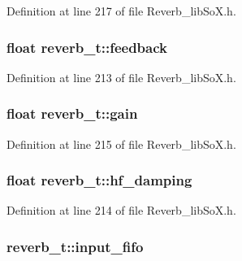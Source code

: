 Definition at line 217 of file Reverb\+\_\+lib\+So\+X.\+h.

\subsubsection[{\texorpdfstring{feedback}{feedback}}]{\setlength{\rightskip}{0pt plus 5cm}float reverb\+\_\+t\+::feedback}\hypertarget{structreverb__t_a8e09720386c31e99f2f011b3cee5c6c0}{}\label{structreverb__t_a8e09720386c31e99f2f011b3cee5c6c0}


Definition at line 213 of file Reverb\+\_\+lib\+So\+X.\+h.

\subsubsection[{\texorpdfstring{gain}{gain}}]{\setlength{\rightskip}{0pt plus 5cm}float reverb\+\_\+t\+::gain}\hypertarget{structreverb__t_ab361b62127cc123d7c218d0b2667d9e9}{}\label{structreverb__t_ab361b62127cc123d7c218d0b2667d9e9}


Definition at line 215 of file Reverb\+\_\+lib\+So\+X.\+h.

\subsubsection[{\texorpdfstring{hf\+\_\+damping}{hf_damping}}]{\setlength{\rightskip}{0pt plus 5cm}float reverb\+\_\+t\+::hf\+\_\+damping}\hypertarget{structreverb__t_a90fe27c0300bfecd2bc770d908c0797d}{}\label{structreverb__t_a90fe27c0300bfecd2bc770d908c0797d}


Definition at line 214 of file Reverb\+\_\+lib\+So\+X.\+h.

\subsubsection[{\texorpdfstring{input\+\_\+fifo}{input_fifo}}]{ reverb\+\_\+t\+::input\+\_\+fifo}\hypertarget{structreverb__t_a600770163691a92853976fe0f5e70cce}{}\label{structreverb__t_a600770163691a92853976fe0f5e70cce}



